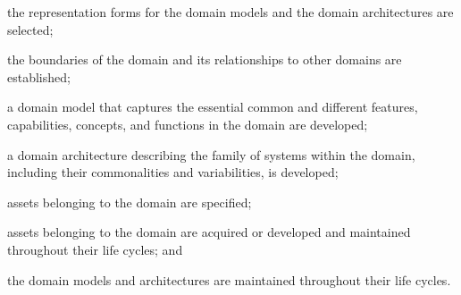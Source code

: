 			\begin{adjustwidth}{2em}{0pt} 

				\begin{compactitem}

					\item the representation forms for the domain models and the domain architectures are selected;

					\item the boundaries of the domain and its relationships to other domains are established;

					\item a domain model that captures the essential common and different features, capabilities, concepts, and functions in the domain are developed;

					\item a domain architecture describing the family of systems within the domain, including their commonalities and variabilities, is developed;

					\item assets belonging to the domain are specified;

					\item assets belonging to the domain are acquired or developed and maintained throughout their life cycles; and

					\item the domain models and architectures are maintained throughout their life cycles.

				\end{compactitem}

			\end{adjustwidth}


